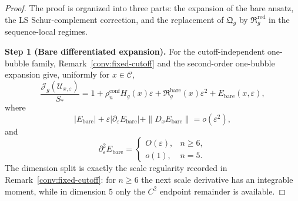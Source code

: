 \documentclass[11pt,reqno,a4paper]{amsart}
\numberwithin{equation}{section}
\theoremstyle{plain}
\theoremstyle{remark}
\theoremstyle{plain}
\begin{document}
\begin{proof}
The proof is organized into three parts: the expansion of the bare ansatz, the LS Schur-complement correction, and the replacement of $\mathfrak Q_g$ by $\mathfrak R_g^{\mathrm{red}}$ in the sequence-local regimes.

\smallskip\noindent
\textbf{Step 1 (Bare differentiated expansion).}
For the cutoff-independent one-bubble family, Remark~\ref{conv:fixed-cutoff} and the second-order
one-bubble expansion give, uniformly for $x\in\mathcal C$,
\begin{equation}\label{eq:bare-onebubble-C2-input}
\frac{\mathcal J_g(\mathcal U_{x,\varepsilon})}{S_\ast}
=
1+\rho_n^{\mathrm{conf}}H_g(x)\varepsilon+
\mathfrak R_g^{\mathrm{bare}}(x)\varepsilon^2+E_{\mathrm{bare}}(x,\varepsilon),
\end{equation}
where
\begin{equation}\label{eq:bare-onebubble-C2-input-remainder}
|E_{\mathrm{bare}}|+
\varepsilon|\partial_\varepsilon E_{\mathrm{bare}}|+
\|D_xE_{\mathrm{bare}}\|=o(\varepsilon^2),
\end{equation}
and
\begin{equation}\label{eq:bare-onebubble-second-scale-input}
\partial_\varepsilon^2E_{\mathrm{bare}}
=
\begin{cases}
O(\varepsilon),& n\ge6,\\[1mm]
o(1),& n=5.
\end{cases}
\end{equation}
The dimension split is exactly the scale regularity recorded in Remark~\ref{conv:fixed-cutoff}: for
$n\ge6$ the next scale derivative has an integrable moment, while in dimension $5$ only the $C^2$ endpoint
remainder is available.


\end{proof}
\end{document}

